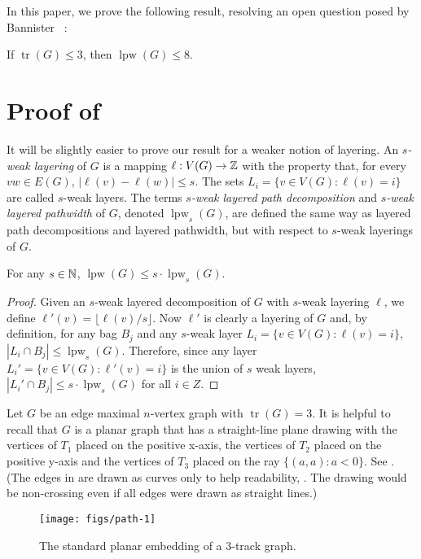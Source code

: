 \documentclass{patmorin}
\DeclareMathOperator{\tr}{tr}
\DeclareMathOperator{\lpw}{lpw}
\begin{document}
In this paper, we prove the following result, resolving an open question
posed by Bannister \etal\ \cite{bannister.devanny.ea:track}:

\begin{thm}
  If $\tr(G)\le 3$, then $\lpw(G)\le 8$.
\end{thm}

\section{Proof of }

It will be slightly easier to prove our result for a weaker notion
of layering.  An \emph{$s$-weak layering} of $G$ is a mapping
$\ell:V(G)\to\mathbb{Z}$ with the property that, for every $vw\in E(G)$,
$|\ell(v)-\ell(w)|\le s$.  The sets $L_i=\{v\in V(G): \ell(v)=i\}$
are called $s$-weak layers.  The terms \emph{$s$-weak layered path
decomposition} and \emph{$s$-weak layered pathwidth} of $G$, denoted
$\lpw_s(G)$, are defined the same way as layered path decompositions
and layered pathwidth, but with respect to $s$-weak layerings of $G$.

\begin{lem}
  For any $s\in\mathbb{N}$, $\lpw(G) \le s\cdot\lpw_s(G)$.
\end{lem}

\begin{proof}
  Given an $s$-weak layered decomposition of $G$ with $s$-weak layering $\ell$, we define
  $\ell'(v)=\lfloor\ell(v)/s\rfloor$. Now $\ell'$ is clearly a layering of $G$ and, by definition, for any bag $B_j$ and any $s$-weak layer $L_i=\{v\in V(G):\ell(v)=i\}$, $|L_i\cap B_j|\le \lpw_s(G)$.  Therefore, since
  any layer $L_i'=\{v\in V(G):\ell'(v)=i\}$ is the union of $s$ weak layers,
  $|L_i'\cap B_j|\le s\cdot\lpw_s(G)$ for all $i\in Z$.
\end{proof}

Let $G$ be an edge maximal $n$-vertex graph with $\tr(G)=3$.  It is
helpful to recall that $G$ is a planar graph that has a straight-line
plane drawing with the vertices of $T_1$ placed on the positive x-axis,
the vertices of $T_2$ placed on the positive y-axis and the vertices of
$T_3$ placed on the ray $\{(a,a):a<0\}$. See . (The
edges in  are drawn as curves only to help
readability, . The drawing would be non-crossing even if all edges were
drawn as straight lines.)

\begin{figure}
  \begin{center}
     \texttt{[image: figs/path-1]}
  \end{center}
  \caption{The standard planar embedding of a 3-track graph.}
\end{figure}
\end{document}
